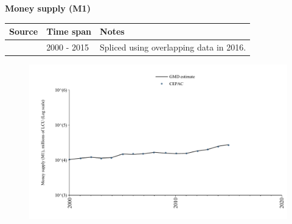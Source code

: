 \documentclass[12pt,a4paper,landscape]{article}
\begin{document}
\begin{adjustbox}{max totalsize={\paperwidth}{\paperheight},center}
\begin{minipage}[t][\textheight][t]{\textwidth}
\vspace*{0.5cm}
{}
\begin{center}
{\Large\bfseries Money supply (M1)}
\end{center}
\vspace{0.5cm}
\begin{table}[H]
\centering
\small
\begin{tabular}{|l|l|l|}
\hline
\textbf{Source} & \textbf{Time span} & \textbf{Notes} \\
\hline
\rowcolor{white}\cite{CEPAC}& 2000 - 2015 &Spliced using overlapping data in 2016. \\
\hline
\end{tabular}
\end{table}
\begin{figure}[H]
\centering
\includegraphics[width=\textwidth,height=0.6\textheight,keepaspectratio]{graphs/CUB_M1.pdf}
\end{figure}
\end{minipage}
\end{adjustbox}
\end{document}
